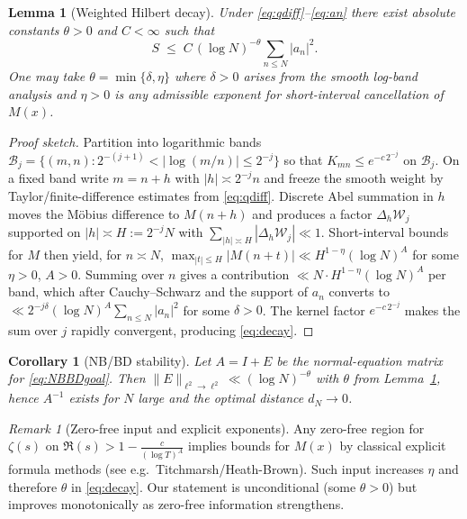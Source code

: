 \documentclass[11pt]{article}
\newtheorem{lemma}{Lemma}
\newtheorem{corollary}{Corollary}
\theoremstyle{remark}
\newtheorem{remark}{Remark}
\begin{document}
\begin{lemma}[Weighted Hilbert decay]\label{lem:hilbert}
Under \eqref{eq:qdiff}--\eqref{eq:an} there exist absolute constants $\theta>0$ and $C<\infty$ such that
\begin{equation}\label{eq:decay}
S\;\le\; C\,(\log N)^{-\theta}\sum_{n\le N} |a_n|^2.
\end{equation}
One may take $\theta=\min\{\delta,\eta\}$ where $\delta>0$ arises from the smooth log-band analysis and $\eta>0$ is any admissible exponent for short-interval cancellation of $M(x)$.
\end{lemma}

\begin{proof}[Proof sketch]
Partition into logarithmic bands
\(
\mathcal{B}_j=\{(m,n):2^{-(j+1)}<|\log(m/n)|\le 2^{-j}\}
\)
so that $K_{mn}\le e^{-c\,2^{-j}}$ on $\mathcal{B}_j$.
On a fixed band write $m=n+h$ with $|h|\asymp 2^{-j}n$ and freeze the smooth weight by Taylor/finite-difference estimates from \eqref{eq:qdiff}.
Discrete Abel summation in $h$ moves the M\"obius difference to $M(n+h)$ and produces a factor $\Delta_h \mathcal{W}_j$ supported on $|h|\asymp H:=2^{-j}N$ with $\sum_{|h|\asymp H}|\Delta_h \mathcal{W}_j|\ll 1$.
Short-interval bounds for $M$ then yield, for $n\asymp N$,
\(
\max_{|t|\le H}|M(n+t)|\ll H^{1-\eta}(\log N)^A
\)
for some $\eta>0$, $A>0$.
Summing over $n$ gives a contribution $\ll N\cdot H^{1-\eta}(\log N)^A$ per band, which after Cauchy--Schwarz and the support of $a_n$ converts to
\(
\ll 2^{-j\delta}(\log N)^A\sum_{n\le N}|a_n|^2
\)
for some $\delta>0$.
The kernel factor $e^{-c\,2^{-j}}$ makes the sum over $j$ rapidly convergent, producing \eqref{eq:decay}.
\end{proof}

\begin{corollary}[NB/BD stability]
Let $A=I+E$ be the normal-equation matrix for \eqref{eq:NBBDgoal}. Then
\(
\|E\|_{\ell^2\to\ell^2}\ll (\log N)^{-\theta}
\)
with $\theta$ from Lemma~\ref{lem:hilbert}, hence $A^{-1}$ exists for $N$ large and the optimal distance $d_N\to 0$.
\end{corollary}

\begin{remark}[Zero-free input and explicit exponents]
Any zero-free region for $\zeta(s)$ on $\Re(s)>1-\frac{c}{(\log T)^A}$ implies bounds for $M(x)$ by classical explicit formula methods (see e.g.\ Titchmarsh/Heath-Brown).
Such input increases $\eta$ and therefore $\theta$ in \eqref{eq:decay}.
Our statement is unconditional (some $\theta>0$) but improves monotonically as zero-free information strengthens.
\end{remark}
\end{document}
